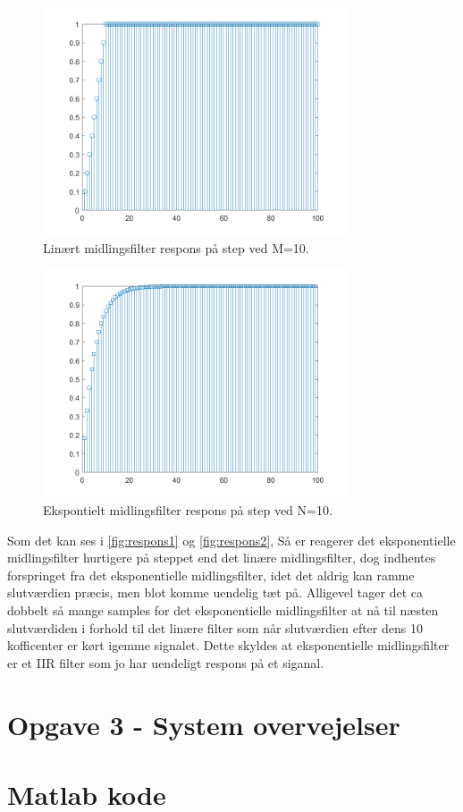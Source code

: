 \documentclass[12pt]{article}
\begin{document}
\begin{figure}[H]
	\centering
	\includegraphics[width=90mm]{Img/respons_alm.png}
	\caption{Linært midlingsfilter respons på step ved M=10.}
	\label{fig:respons1}
\end{figure}


\begin{figure}[H]
	\centering
	\includegraphics[width=90mm]{Img/respons_ex.png}
	\caption{Ekspontielt midlingsfilter respons på step ved N=10.}
	\label{fig:respons2}
\end{figure}
Som det kan ses i \autoref{fig:respons1} og \autoref{fig:respons2}, Så er reagerer det eksponentielle midlingsfilter hurtigere på steppet end det linære midlingsfilter, dog indhentes forspringet fra det eksponentielle midlingsfilter, idet det aldrig kan ramme slutværdien præcis, men blot komme uendelig tæt på. Alligevel tager det ca dobbelt så mange samples for det eksponentielle midlingsfilter at nå til næsten slutværdiden i forhold til det linære filter som når slutværdien efter dens 10 kofficenter er kørt igemme signalet. Dette skyldes at eksponentielle midlingsfilter er et IIR filter som jo har uendeligt respons på et siganal.


\section{Opgave 3 - System overvejelser}

\section{Matlab kode}	
\end{document}
